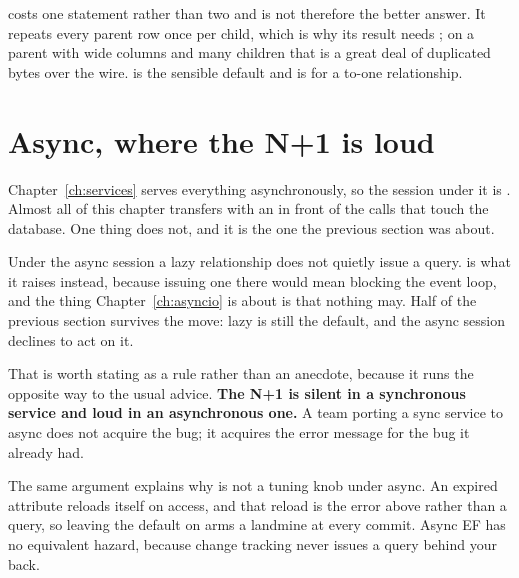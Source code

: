 \begin{note}
 costs one statement rather than two and is not therefore
the better answer. It repeats every parent row once per child, which is why
its result needs ; on a parent with wide columns and many
children that is a great deal of duplicated bytes over the wire.
 is the sensible default and  is for a
to-one relationship.
\end{note}

\section{Async, where the N+1 is loud}
\label{sec:ch10-async}

Chapter~\ref{ch:services} serves everything asynchronously, so the session
under it is . Almost all of this chapter transfers with
an  in front of the calls that touch the database. One thing
does not, and it is the one the previous section was about.



\noindent
Under the async session a lazy relationship does not quietly issue a query.
 is what it raises instead, because issuing one there
would mean blocking the event loop, and the thing Chapter~\ref{ch:asyncio}
is about is that nothing may. Half of the previous section survives the
move: lazy is still the default, and the async session declines to act on
it.

That is worth stating as a rule rather than an anecdote, because it runs the
opposite way to the usual advice. \textbf{The N+1 is silent in a synchronous
service and loud in an asynchronous one.} A team porting a sync service to
async does not acquire the bug; it acquires the error message for the bug it
already had.

\begin{csbox}
The same argument explains why  is not a
tuning knob under async. An expired attribute reloads itself on access, and
that reload is the error above rather than a query, so leaving the default
on arms a landmine at every commit. Async EF has no equivalent hazard,
because change tracking never issues a query behind your back.
\end{csbox}

